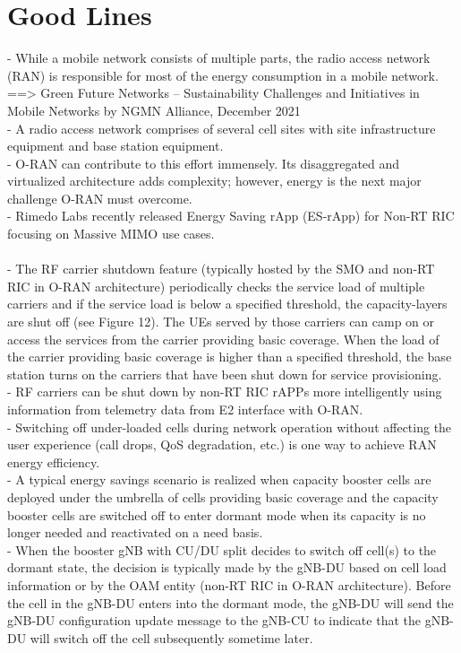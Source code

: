 \documentclass[conference]{IEEEtran}
\begin{document}
\section{Good Lines}
- While a mobile network consists of multiple parts, the radio access network (RAN) is responsible for most of the energy consumption in a mobile network. ==> 
Green Future Networks – Sustainability Challenges and Initiatives in Mobile Networks by NGMN Alliance,
December 2021
\href{https://www.ngmn.org/wp-content/uploads/210719_NGMN_GFN_Sustainability-Challenges-andInitiatives_v1.0.pdf} \\
- A radio access network comprises of several cell sites with site infrastructure equipment and base station equipment. \\
- O-RAN can contribute to this effort immensely. Its disaggregated and virtualized architecture adds complexity; however, energy is the next major challenge O-RAN must overcome. \\
- Rimedo Labs recently released Energy Saving rApp (ES-rApp) for Non-RT RIC focusing on Massive MIMO use cases. \\ 
\\
- The RF carrier shutdown feature (typically hosted by the SMO and non-RT RIC in O-RAN architecture)
periodically checks the service load of multiple carriers and if the service load is below a specified threshold, the capacity-layers are shut off (see Figure 12). The UEs served by those carriers can camp on or access the services from the carrier providing basic coverage. When the load of the carrier providing basic coverage is higher than a specified threshold, the base station turns on the carriers that have been shut down for service provisioning. \\
- RF carriers can be shut down by non-RT RIC rAPPs more intelligently using information from telemetry data from E2 interface with O-RAN.\\
- Switching off under-loaded cells during network operation without affecting the user experience (call drops, QoS degradation, etc.) is one way to achieve RAN energy efficiency. \\
- A typical energy savings scenario is realized when capacity booster cells are deployed under the umbrella of cells providing basic coverage and the capacity booster cells are switched off to enter dormant mode when its capacity is no longer needed and reactivated on a need basis. \\
- When the booster gNB with CU/DU split decides to switch off cell(s) to the dormant state, the decision is typically made by the gNB-DU based on cell load information or by the OAM entity (non-RT RIC in O-RAN architecture). Before the cell in the gNB-DU enters into the dormant mode, the gNB-DU will send the gNB-DU configuration update message to the gNB-CU to indicate that the gNB-DU will switch off the cell subsequently sometime later. \\ 
\end{document}
